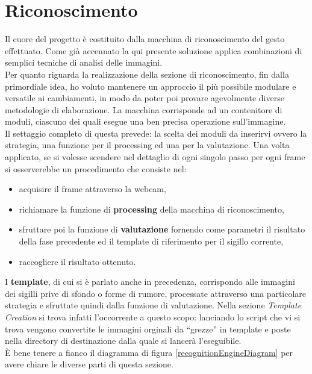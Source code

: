 \documentclass[a4paper,10pt, twocolumn]{article}
\begin{document}
\section{Riconoscimento}\label{recogntionEngineSection}
Il cuore del progetto \`{e} costituito dalla macchina di riconoscimento del gesto effettuato.
Come gi\`{a} accennato la qui presente soluzione applica combinazioni di 
semplici tecniche di analisi delle immagini.\\
Per quanto riguarda la realizzazione della sezione di riconoscimento, 
fin dalla primordiale idea, ho voluto mantenere un approccio il pi\`{u} possibile modulare
e versatile ai cambiamenti, in modo da poter poi provare agevolmente diverse metodologie
di elaborazione. La macchina corrisponde ad un contenitore di moduli, ciascuno 
dei quali esegue una ben precisa operazione sull'immagine.\\
Il settaggio completo di questa prevede: la scelta dei moduli
da inserirvi ovvero la strategia, una funzione per il processing ed una per la 
valutazione.
Una volta applicato, se si volesse scendere
nel dettaglio di ogni singolo passo per 
ogni frame si osserverebbe un procedimento che consiste nel:
\begin{itemize}
 \item acquisire il frame attraverso la webcam, 
 \item richiamare la funzione di \textbf{processing} della macchina di riconoscimento,
 \item sfruttare poi la funzione di \textbf{valutazione} fornendo come parametri
 il risultato della fase precedente ed il template di riferimento
 per il sigillo corrente,
 \item raccogliere il risultato ottenuto.
\end{itemize}
I \textbf{template}, di cui si \`{e} parlato anche in precedenza,
corrispondo alle immagini dei sigilli prive di sfondo o
forme di rumore, processate attraverso una particolare strategia e sfruttate
quindi dalla funzione di valutazione. Nella sezione \textit{Template Creation} 
si trova infatti l'occorrente a questo scopo: lanciando lo
script che vi si trova vengono convertite le immagini orginali da ``grezze'' 
in template e poste nella directory di destinazione dalla quale si lancer\`{a}
l'eseguibile. \\
\`{E} bene tenere a fianco il diagramma di figura \ref{recognitionEngineDiagram} 
per avere chiare le diverse parti di questa sezione.
 
\end{document}
